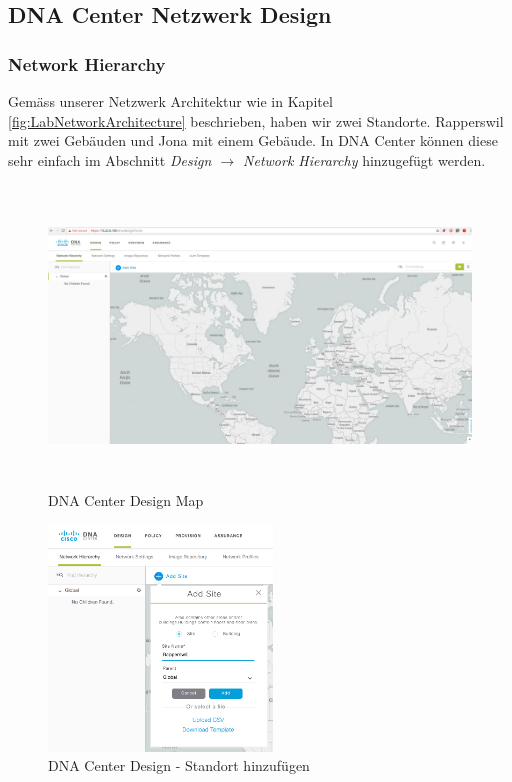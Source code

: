 \subsection{DNA Center Netzwerk Design}
\label{DNACenterNetwork_Design}
\subsubsection{Network Hierarchy}

Gemäss unserer Netzwerk Architektur wie in Kapitel \ref{fig:LabNetworkArchitecture} beschrieben, haben wir zwei Standorte. Rapperswil mit zwei Gebäuden und Jona mit einem Gebäude.
In DNA Center können diese sehr einfach im Abschnitt \textit{Design $\rightarrow$ Network Hierarchy} hinzugefügt werden. 

\begin{figure}[H]
	\centering
	\includegraphics[height=8cm]{img/Selection_011.png}
	\caption{DNA Center Design Map}
	\label{fig:dna-center-design-1}
\end{figure}

\begin{figure}[H]
	\centering
	\includegraphics[height=6cm]{img/Selection_012.png}
	\caption{DNA Center Design - Standort hinzufügen}
	\label{fig:dna-center-design-2}
\end{figure}


